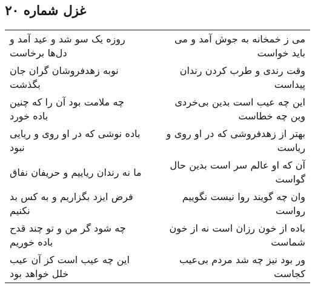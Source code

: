 \begin{center}
\section*{غزل شماره ۲۰}
\label{sec:sh020}
\begin{longtable}{l p{0.5cm} r}
روزه یک سو شد و عید آمد و دل‌ها برخاست
&&
می ز خمخانه به جوش آمد و می باید خواست
\\
نوبه زهدفروشان گران جان بگذشت
&&
وقت رندی و طرب کردن رندان پیداست
\\
چه ملامت بود آن را که چنین باده خورد
&&
این چه عیب است بدین بی‌خردی وین چه خطاست
\\
باده نوشی که در او روی و ریایی نبود
&&
بهتر از زهدفروشی که در او روی و ریاست
\\
ما نه رندان ریاییم و حریفان نفاق
&&
آن که او عالم سر است بدین حال گواست
\\
فرض ایزد بگزاریم و به کس بد نکنیم
&&
وان چه گویند روا نیست نگوییم رواست
\\
چه شود گر من و تو چند قدح باده خوریم
&&
باده از خون رزان است نه از خون شماست
\\
این چه عیب است کز آن عیب خلل خواهد بود
&&
ور بود نیز چه شد مردم بی‌عیب کجاست
\\
\end{longtable}
\end{center}
